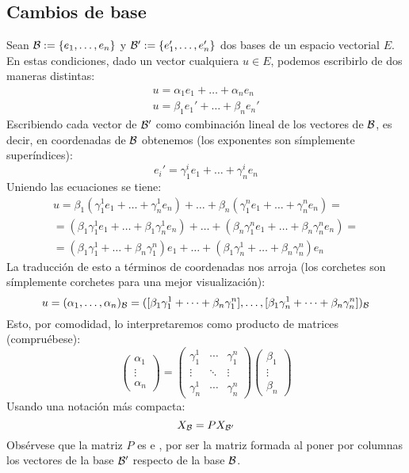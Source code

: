 \subsection{Cambios de base}
Sean $\mathcal{B}:=\{e_1,\dots,e_n\}$ y $\mathcal{B}':=\{e_1',\dots,e_n'\}$ dos bases de un espacio vectorial $E$.
En estas condiciones, dado un vector cualquiera $u\in E$, podemos escribirlo de dos maneras distintas:
\begin{gather}
	u=\alpha_1e_1+\dots+\alpha_ne_n\\
	\label{A1_eq_escritura2}
	u=\beta_1e_1'+\dots+\beta_ne_n'
\end{gather}
Escribiendo cada vector de $\mathcal{B}'$ como combinación lineal de los vectores de $\mathcal{B}$, es decir, en coordenadas de $\mathcal{B}$ obtenemos (los exponentes son símplemente superíndices):
\begin{equation}
	e_i'=\gamma_1^ie_1+\dots+\gamma_n^ie_n
\end{equation}
Uniendo las ecuaciones se tiene:
\begin{multline}
	u=\beta_1(\gamma_1^1e_1+\dots+\gamma_n^1e_n)+\dots+\beta_n(\gamma_1^ne_1+\dots+\gamma_n^ne_n)=\\
	=(\beta_1\gamma_1^1e_1+\dots+\beta_1\gamma_n^1e_n)+\dots+(\beta_n\gamma_1^ne_1+\dots+\beta_n\gamma_n^ne_n)=\\
	=(\beta_1\gamma_1^1+\dots+\beta_n\gamma_1^n)e_1+\dots+(\beta_1\gamma_n^1+\dots+\beta_n\gamma_n^n)e_n
\end{multline}
La traducción de esto a términos de coordenadas nos arroja (los corchetes son símplemente corchetes para una mejor visualización):
\begin{equation}
	u=(\alpha_1,\dots,\alpha_n)_{\mathcal{B}}=([\beta_1\gamma_1^1+\dots+\beta_n\gamma_1^n],\dots,[\beta_1\gamma_n^1+\dots+\beta_n\gamma_n^n])_{\mathcal{B}}
\end{equation}
Esto, por comodidad, lo interpretaremos como producto de matrices (compruébese):
\begin{equation}
	\begin{pmatrix}
	\alpha_1\\
	\vdots\\
	\alpha_n
	\end{pmatrix}=
	\begin{pmatrix}
	\gamma_1^1 & \cdots & \gamma_1^n\\
	\vdots & \ddots & \vdots\\
	\gamma_n^1 & \cdots & \gamma_n^n
	\end{pmatrix}
	\begin{pmatrix}
	\beta_1\\
	\vdots\\
	\beta_n
	\end{pmatrix}
\end{equation}
Usando una notación más compacta:
\begin{equation}
	X_{\mathcal{B}}=PX_{\mathcal{B}'}
\end{equation}
Obsérvese que la matriz $P$ es  e , por ser la matriz formada al poner por columnas los vectores de la base $\mathcal{B}'$ respecto de la base $\mathcal{B}$.


